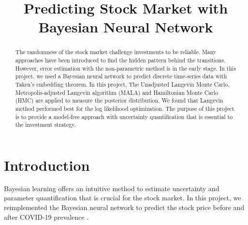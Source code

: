 \documentclass{article}
\title{Predicting Stock Market with Bayesian Neural Network}
\begin{document}
\maketitle


\begin{abstract}
The randomness of the stock market challenge investments to be reliable. Many approaches have been introduced to find the hidden pattern behind the transitions. However, error estimation with the non-parametric method is in the early stage. In this project, we used a Bayesian neural network to predict discrete  time-series data with Taken's embedding theorem. In this project, The Unadjusted Langevin Monte Carlo, Metropolis-adjusted Langevin algorithm (MALA) and Hamiltonian Monte Carlo (HMC) are applied to measure the posterior distribution. We found that Langevin method performed best for the log likelihood optimization. The purpose of this project is to provide a model-free approach with uncertainty quantification that is essential to the investment strategy. 
\end{abstract}

\section{Introduction}





Bayesian learning offers an intuitive method to estimate uncertainty and parameter quantification that is crucial for the stock market.  In this project, we reimplemented the Bayesian neural network to predict the stock price before and after COVID-19 prevalence \citep{chandra2021bayesian}. 


\end{document}
